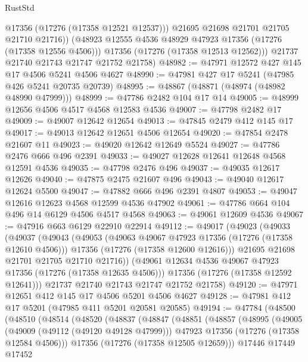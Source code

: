 \begin{lexlean}{RustStd}
\begin{coremodule}
              @17356
              (@17276 (@17358 @12521 @12537)))
            @21695
            @21698
            @21701
            @21705
            @21710
            @21716))
        (@48923 @12555 @4536 @48929 @47923 @17356 (@17276 (@17358 @12556 @4506)))
        @17356
        (@17276 (@17358 @12513 @12562)))
      @21737
      @21740
      @21743
      @21747
      @21752
      @21758)
@48982 := @47971 @12572 @427 @145 @17 @4506 @5241 @4506 @4627
@48990 := @47981 @427 @17 @5241 (@47985 @426 @5241 @20735 @20739)
@48995 := @48867 (@48871 (@48974 (@48982 @48990 @47999)))
@48999 := @47786 @2482 @104 @17 @14
@49005 := @48999 @12656 @4506 @4517 @4568 @12583 @4536
@49007 := @47798 @2482 @17
@49009 := @49007 @12642 @12654
@49013 := @47845 @2479 @412 @145 @17
@49017 := @49013 @12642 @12651 @4506 @12654
@49020 := @47854 @2478 @21607 @11
@49023 := @49020 @12642 @12649 @5524
@49027 := @47786 @2476 @666 @496 @2391
@49033 := @49027 @12628 @12641 @12648 @4568 @12591 @4536
@49035 := @47798 @2476 @496
@49037 := @49035 @12617 @12626
@49040 := @47875 @2475 @21607 @496
@49043 := @49040 @12617 @12624 @5500
@49047 := @47882 @666 @496 @2391 @4807
@49053 := @49047 @12616 @12623 @4568 @12599 @4536 @47902
@49061 := @47786 @664 @104 @496 @14 @6129 @4506 @4517 @4568
@49063 := @49061 @12609 @4536
@49067 := @47916 @663 @6129 @22910 @22914
@49112 := @49017
    (@49023
      (@49033
        (@49037
          (@49043
            (@49053
              (@49063 @49067 @47923 @17356 (@17276 (@17358 @12610 @4506)))
              @17356
              (@17276 (@17358 @12600 @12616)))
            @21695
            @21698
            @21701
            @21705
            @21710
            @21716))
        (@49061 @12634 @4536 @49067 @47923 @17356 (@17276 (@17358 @12635 @4506)))
        @17356
        (@17276 (@17358 @12592 @12641)))
      @21737
      @21740
      @21743
      @21747
      @21752
      @21758)
@49120 := @47971 @12651 @412 @145 @17 @4506 @5201 @4506 @4627
@49128 := @47981 @412 @17 @5201 (@47985 @411 @5201 @20581 @20585)
@49194 := @47784
    (@48500
      (@48510
        (@48514
          (@48520
            (@48837
              (@48847
                (@48851
                  (@48857
                    (@48995
                      (@49005
                        (@49009 (@49112 (@49120 @49128 @47999)))
                        @47923
                        @17356
                        (@17276 (@17358 @12584 @4506)))
                      @17356
                      (@17276 (@17358 @12505 @12659)))
                    @17446
                    @17449
                    @17452

\end{coremodule}
\end{lexlean}
